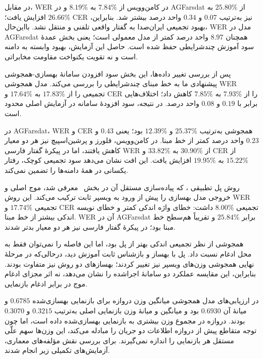 در مقابل، WER در کامن‌وویس از $7.84\%$ به $8.19\%$ و در AGFarsdat از $25.80\%$ به $26.66\%$ افزایش یافت؛ CER نیز به‌ترتیب $0.07$ و $0.34$ واحد درصد بیشتر شد. بنابراین، بهبود تجمیعی ایران‌صدا به گفتار واقعی تلفنی و  منتقل نشد. بااین‌حال، WER مدل در AGFarsdat همچنان $8.97$ واحد درصد کمتر از مدل معمولی است؛ یعنی بخش عمدهٔ سود آموزش چندشرایطی حفظ شده است. حاصل این آزمایش، بهبود وابسته به دامنه است و نه تقویت یکنواخت مقاومت مخابراتی.



پس از بررسی تغییر داده‌ها، این بخش سود افزودن سامانهٔ بهسازی-همجوشی پیشنهادی ما به خط مبنای چندشرایطی را بررسی می‌کند. مدل همجوشی WER تجمیعی را از $17.83\%$ به $17.64\%$ و CER را از $7.93\%$ به $7.85\%$ کاهش داد؛ اختلاف‌هایی برابر با $0.19$ و $0.08$ واحد درصد. در نتیجه، سود افزودهٔ سامانه در آزمایش اصلی محدود است.

در AGFarsdat، WER و CER همجوشی به‌ترتیب $25.37\%$ و $12.39\%$ بود؛ یعنی $0.43$ و $0.23$ واحد درصد کمتر از خط مبنا. در کامن‌وویس، فلورز و پرشین‌اسپیچ نیز هر دو معیار کاهش یافتند، اما در پیکرهٔ گفتار فارسی WER از $30.90\%$ به $33.82\%$ و CER از $15.22\%$ به $19.95\%$ افزایش یافت. این افت نشان می‌دهد سود تجمیعی کوچک، رفتار یکسانی در همهٔ دامنه‌ها را تضمین نمی‌کند.

روش پل تطبیقی ، که پیاده‌سازی مستقل آن در بخش~ معرفی شد، موج اصلی و خروجی مدل بهسازی  را پیش از ورود به ویسپر ثابت ترکیب می‌کند. این روش WER تجمیعی $17.74\%$ و CER تجمیعی $8.00\%$ داشت: خطای واژه اندکی کمتر و خطای نویسه اندکی بیشتر از خط مبنا. WER آن در AGFarsdat برابر $25.84\%$ و تقریباً هم‌سطح خط مبنا بود؛ در پیکرهٔ گفتار فارسی نیز هر دو معیار بدتر شدند.

همجوشی از نظر تجمیعی اندکی بهتر از پل بود، اما این فاصله را نمی‌توان فقط به محل ادغام نسبت داد. پل با بهساز و بازشناس ثابت آموزش دید، درحالی‌که در مرحلهٔ نهایی همجوشی وزن‌های ویسپر نیز تغییر کردند؛ بهسازهای دو روش نیز متفاوت بودند. بنابراین، این مقایسه عملکرد دو سامانهٔ اجراشده را نشان می‌دهد، نه اثر مجزای ادغام موج در برابر ادغام بازنمایی.


در ارزیابی‌های مدل همجوشی میانگین وزن دروازه برای بازنمایی بهسازی‌شده $0.6785$ و میانهٔ آن $0.6930$ بود و میانگین و میانهٔ وزن بازنمایی اصلی به‌ترتیب $0.3215$ و $0.3070$ بودند. دروازه در مجموع وزن بیشتری به بازنمایی بهسازی‌شده داده است، اما چون توجه متقاطع پیش از دروازه اطلاعات دو جریان را مبادله می‌کند، این وزن‌ها سهم علّی مستقل هر بازنمایی را اندازه نمی‌گیرند. برای بررسی نقش مؤلفه‌های معماری، آزمایش‌های تکمیلی زیر انجام شدند.

